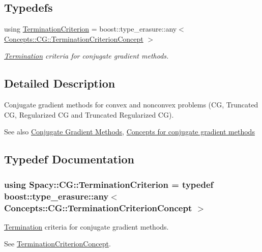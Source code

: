\subsection*{Typedefs}
\begin{DoxyCompactItemize}
\item 
using \hyperlink{group__CGGroup_gaa927be31b313bb4ce635668c77b55860_gaa927be31b313bb4ce635668c77b55860}{Termination\+Criterion} = boost\+::type\+\_\+erasure\+::any$<$ \hyperlink{group__CGConceptGroup_ga6b30d103c365816efcfb038d922aef07_ga6b30d103c365816efcfb038d922aef07}{Concepts\+::\+C\+G\+::\+Termination\+Criterion\+Concept} $>$
\begin{DoxyCompactList}\small\item\em \hyperlink{namespaceSpacy_1_1CG_1_1Termination}{Termination} criteria for conjugate gradient methods. \end{DoxyCompactList}\end{DoxyCompactItemize}


\subsection{Detailed Description}
Conjugate gradient methods for convex and nonconvex problems (C\+G, Truncated C\+G, Regularized C\+G and Truncated Regularized C\+G). 

\begin{DoxySeeAlso}{See also}
\hyperlink{group__CGGroup}{Conjugate Gradient Methods}, \hyperlink{group__CGConceptGroup}{Concepts for conjugate gradient methods} 
\end{DoxySeeAlso}


\subsection{Typedef Documentation}
\hypertarget{group__CGGroup_gaa927be31b313bb4ce635668c77b55860_gaa927be31b313bb4ce635668c77b55860}{}
\subsubsection[{Termination\+Criterion}]{\setlength{\rightskip}{0pt plus 5cm}using {\bf Spacy\+::\+C\+G\+::\+Termination\+Criterion} = typedef boost\+::type\+\_\+erasure\+::any$<$ {\bf Concepts\+::\+C\+G\+::\+Termination\+Criterion\+Concept} $>$}\label{group__CGGroup_gaa927be31b313bb4ce635668c77b55860_gaa927be31b313bb4ce635668c77b55860}


\hyperlink{namespaceSpacy_1_1CG_1_1Termination}{Termination} criteria for conjugate gradient methods. 

\label{group__CGGroup_gaa927be31b313bb4ce635668c77b55860_CG_TerminationCriterionAnchor}%
\hypertarget{group__CGGroup_gaa927be31b313bb4ce635668c77b55860_CG_TerminationCriterionAnchor}{}%
See \hyperlink{group__CGConceptGroup_ga6b30d103c365816efcfb038d922aef07_CG_TerminationCriterionConceptAnchor}{Termination\+Criterion\+Concept}. 